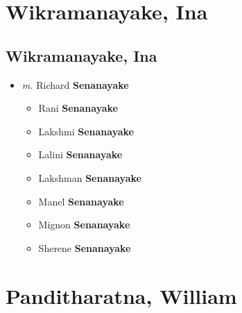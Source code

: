 \documentclass[10pt, openany]{book}
\begin{document}
\part{Wikramanayake, Ina}
\chapter{Wikramanayake, Ina}
\label{00004195}
\textcolor{slmaroon}{\textit{}}
\begin{itemize}
\item{\textit{m.} Richard \textbf{Senanayake} \textcolor{slorange}{\textit{}}   \label{couple:00004195:00004196} \begin{itemize}
\item{Rani \textbf{Senanayake} \textcolor{slorange}{\textit{}}
 }
\item{Lakshmi \textbf{Senanayake} \textcolor{slorange}{\textit{}}
 }
\item{Lalini \textbf{Senanayake} \textcolor{slorange}{\textit{}}
 }
\item{Lakshman \textbf{Senanayake} \textcolor{slorange}{\textit{}}
 }
\item{Manel \textbf{Senanayake} \textcolor{slorange}{\textit{}}
 }
\item{Mignon \textbf{Senanayake} \textcolor{slorange}{\textit{}}
 }
\item{Sherene \textbf{Senanayake} \textcolor{slorange}{\textit{}}
 }
\end{itemize}}
\end{itemize}
 
\part{Panditharatna, William}
\end{document}
